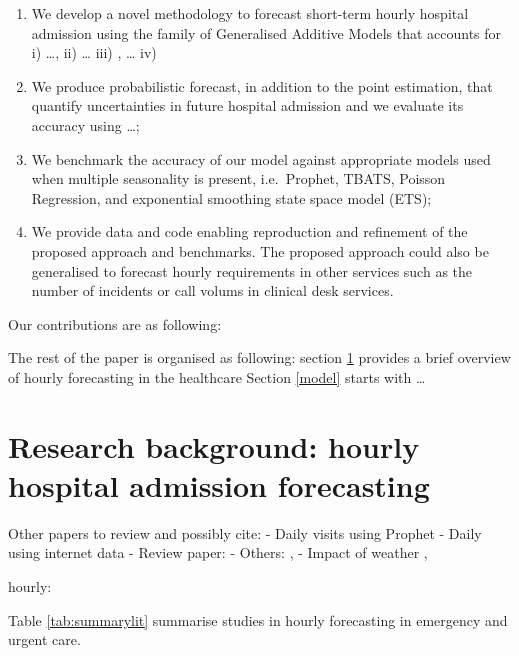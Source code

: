 \documentclass[]{elsarticle} %
\begin{document}
\begin{enumerate}
\def\labelenumi{\arabic{enumi}.}
\item
  We develop a novel methodology to forecast short-term hourly hospital admission using the family of Generalised Additive Models that accounts for i) \ldots, ii) \ldots{} iii) , \ldots{} iv)
\item
  We produce probabilistic forecast, in addition to the point estimation, that quantify uncertainties in future hospital admission and we evaluate its accuracy using \ldots;
\item
  We benchmark the accuracy of our model against appropriate models used when multiple seasonality is present, i.e.~Prophet, TBATS, Poisson Regression, and exponential smoothing state space model (ETS);
\item
  We provide data and code enabling reproduction and refinement of the proposed approach and benchmarks. The proposed approach could also be generalised to forecast hourly requirements in other services such as the number of incidents or call volums in clinical desk services.
\end{enumerate}

Our contributions are as following:

The rest of the paper is organised as following: section \ref{lit} provides a brief overview of hourly forecasting in the healthcare Section \ref{model} starts with \ldots{}

\hypertarget{lit}{%
\section{Research background: hourly hospital admission forecasting}\label{lit}}

Other papers to review and possibly cite:
- Daily visits using Prophet \citet{park2019144}
- Daily using internet data \citet{ekstrom2015forecasting}
- Review paper: \citet{wargon2009systematic}
- Others: \citet{boyle2012predicting},
- Impact of weather \citet{parsons2011modelling}, \citet{macgregor2003effect}

hourly:
\citet{cheng2021forecasting}
\citet{rocha2021forecasting}

Table \ref{tab:summarylit} summarise studies in hourly forecasting in emergency and urgent care.
\end{document}
